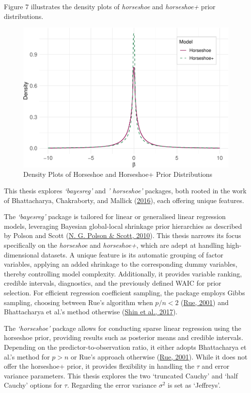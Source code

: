 \documentclass[
  11pt,
]{article}
\begin{document}
Figure 7 illustrates the density plots of \emph{horseshoe} and
\emph{horseshoe+} prior distributions.

\begin{figure}[H]

{\centering \includegraphics[width=0.75\linewidth]{dissertation_files/figure-latex/Horseshoe Plus Priors-1} 

}

\caption{Density Plots of Horseshoe and Horseshoe+ Prior Distributions}\label{fig:Horseshoe Plus Priors}
\end{figure}

This thesis explores \emph{`bayesreg'} and \emph{' horseshoe'} packages,
both rooted in the work of Bhattacharya, Chakraborty, and Mallick
(\protect\hyperlink{ref-Bhattacharya2016}{2016}), each offering unique
features.

The \emph{`bayesreg'} package is tailored for linear or generalised
linear regression models, leveraging Bayesian global-local shrinkage
prior hierarchies as described by Polson and Scott
(\protect\hyperlink{ref-Polson2010}{N. G. Polson \& Scott, 2010}). This
thesis narrows its focus specifically on the \emph{horseshoe} and
\emph{horseshoe+}, which are adept at handling high-dimensional
datasets. A unique feature is its automatic grouping of factor
variables, applying an added shrinkage to the corresponding dummy
variables, thereby controlling model complexity. Additionally, it
provides variable ranking, credible intervals, diagnostics, and the
previously defined WAIC for prior selection. For efficient regression
coefficient sampling, the package employs Gibbs sampling, choosing
between Rue's algorithm when \(p/n < 2\)
(\protect\hyperlink{ref-Rue2001}{Rue, 2001}) and Bhattacharya et al.'s
method otherwise (\protect\hyperlink{ref-Shin2018}{Shin et al., 2017}).

The \emph{`horseshoe'} package allows for conducting sparse linear
regression using the horseshoe prior, providing results such as
posterior means and credible intervals. Depending on the
predictor-to-observation ratio, it either adopts Bhattacharya et al.'s
method for \(p > n\) or Rue's approach otherwise
(\protect\hyperlink{ref-Rue2001}{Rue, 2001}). While it does not offer
the horseshoe+ prior, it provides flexibility in handling the \(\tau\)
and error variance parameters. This thesis explores the two `truncated
Cauchy' and `half Cauchy' options for \(\tau\). Regarding the error
variance \(\sigma^2\) is set as `Jeffreys'.
\end{document}

